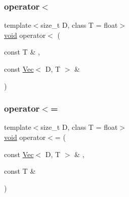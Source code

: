 \mbox{\label{classtrimesh_1_1Vec_affdb466b5a6cde5aeb0578429c2a87af}} 
\subsubsection{\texorpdfstring{operator$<$}{operator<}\hspace{0.1cm}{\footnotesize\ttfamily [2/2]}}
{\footnotesize\ttfamily template$<$size\+\_\+t D, class T = float$>$ \\
\hyperlink{namespacetrimesh_a784ddfd979e1c579bda795a8edfc3f43}{void} operator$<$ (\begin{DoxyParamCaption}\item[{const T \&}]{,  }\item[{const \hyperlink{classtrimesh_1_1Vec}{Vec}$<$ D, T $>$ \&}]{ }\end{DoxyParamCaption})\hspace{0.3cm}{\ttfamily [friend]}}

\mbox{\label{classtrimesh_1_1Vec_abd5f9708a2a26b804e9c55bc0ec00f8d}} 
\subsubsection{\texorpdfstring{operator$<$=}{operator<=}\hspace{0.1cm}{\footnotesize\ttfamily [1/2]}}
{\footnotesize\ttfamily template$<$size\+\_\+t D, class T = float$>$ \\
\hyperlink{namespacetrimesh_a784ddfd979e1c579bda795a8edfc3f43}{void} operator$<$= (\begin{DoxyParamCaption}\item[{const \hyperlink{classtrimesh_1_1Vec}{Vec}$<$ D, T $>$ \&}]{,  }\item[{const T \&}]{ }\end{DoxyParamCaption})\hspace{0.3cm}{\ttfamily [friend]}}

\mbox{\label{classtrimesh_1_1Vec_aa4d2343db642537fcd355c436f7e2d82}} 
